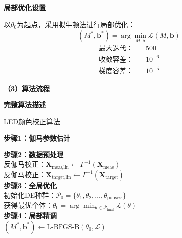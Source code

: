  \textbf{局部优化设置}

以$\theta_0$为起点，采用拟牛顿法进行局部优化：
\begin{equation}
  (M^*,\mathbf{b}^*) = \arg\min_{M,\mathbf{b}} \mathcal{L}(M,\mathbf{b})
\end{equation}
\begin{align}
  \text{最大迭代：} &\quad 500\\
  \text{收敛容差：} &\quad 10^{-6}\\
  \text{梯度容差：} &\quad 10^{-5}
\end{align}

\noindent\textbf{（3）算法流程}

 \textbf{完整算法描述}

\begin{algorithm}[H]\small
{} %
\renewcommand{\algorithmcfname}{算法}
	\caption{LED颜色校正算法}
	
	\textbf{步骤1：伽马参数估计}\\
	
	\textbf{步骤2：数据预处理}\\
	反伽马校正：$\mathbf{X}_{\text{meas,lin}} \leftarrow \Gamma^{-1}(\mathbf{X}_{\text{meas}})$\\
	反伽马校正：$\mathbf{X}_{\text{target,lin}} \leftarrow \Gamma^{-1}(\mathbf{X}_{\text{target}})$\\
	
	\textbf{步骤3：全局优化}\\
	初始化DE种群：$\mathcal{P}_0 = \{\theta_1, \theta_2, \ldots, \theta_{\text{popsize}}\}$\\
	获得最优个体：$\theta_0 = \arg\min_{\theta \in \mathcal{P}_{\text{final}}} \mathcal{L}(\theta)$\\
	
	\textbf{步骤4：局部精调}\\
	$(M^*, \mathbf{b}^*) \leftarrow \text{L-BFGS-B}(\theta_0, \mathcal{L})$\\
	
	\label{algorithm:led_correction}
\end{algorithm}
\vspace{20pt}

